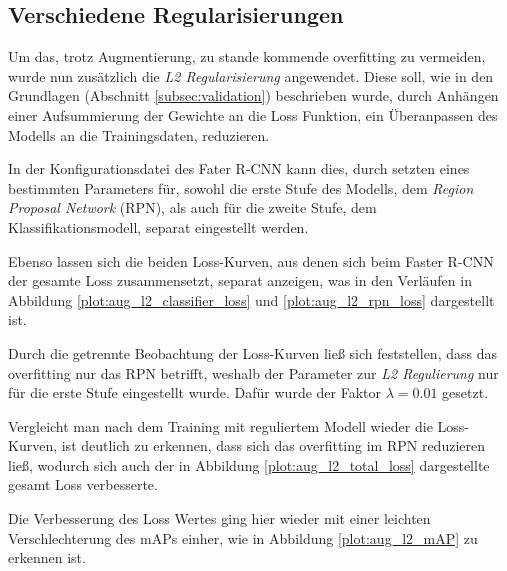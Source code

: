 \subsection{Verschiedene Regularisierungen}

Um das, trotz Augmentierung, zu stande kommende \Gls{overfitting} zu 
vermeiden, wurde nun zusätzlich die  \textit{L2 Regularisierung}
angewendet.
Diese soll, wie in den Grundlagen (Abschnitt \ref{subsec:validation})
beschrieben wurde, durch Anhängen einer Aufsummierung der Gewichte
an die Loss Funktion, ein Überanpassen des Modells an die
Trainingsdaten, reduzieren.

In der Konfigurationsdatei des Fater R-CNN kann dies,
durch setzten eines bestimmten Parameters für, sowohl die
erste Stufe des Modells, dem \textit{Region Proposal Network} (RPN),
als auch für die zweite Stufe, dem Klassifikationsmodell,
separat eingestellt werden.

Ebenso lassen sich die beiden Loss-Kurven, aus denen sich 
beim Faster R-CNN der gesamte Loss zusammensetzt,
separat anzeigen, was in den Verläufen in 
Abbildung \ref{plot:aug_l2_classifier_loss}
und \ref{plot:aug_l2_rpn_loss} dargestellt ist.

Durch die getrennte Beobachtung der Loss-Kurven ließ sich 
feststellen, dass das \Gls{overfitting} nur das RPN betrifft,
weshalb der Parameter zur \textit{L2 Regulierung} nur 
für die erste Stufe eingestellt wurde.
Dafür wurde der Faktor $\lambda = 0.01$ gesetzt.

Vergleicht man nach dem Training mit 
reguliertem Modell wieder die Loss-Kurven, ist deutlich zu 
erkennen, dass sich das \Gls{overfitting} im RPN 
reduzieren ließ, wodurch sich auch der
in Abbildung \ref{plot:aug_l2_total_loss} 
dargestellte gesamt Loss verbesserte.

Die Verbesserung des Loss Wertes 
ging hier wieder mit einer leichten 
Verschlechterung des mAPs einher, wie in Abbildung
\ref{plot:aug_l2_mAP} zu erkennen ist.

